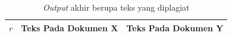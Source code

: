 \documentclass[../Book.tex]{subfiles}
\begin{document}
		\begin{longtable}{@{}lp{7cm}p{7cm}@{}}
			\caption[\textit{Output} akhir berupa teks yang diplagiat]{\textit{Output} akhir berupa teks yang diplagiat} \label{output-real} \\
			\hline
			$r$       & Teks Pada Dokumen X                                                                                                                                                                                                                                                                                                                                                                                                                                                                                                                                                                                                                           & Teks Pada Dokumen Y                                                                                                                                                                                                                                                                                                                                                                                                                                                                                                                                                                                                                                                                                                                                                                                                                                                                                                                                                                                       \\ \hline

\end{longtable}
\end{document}
